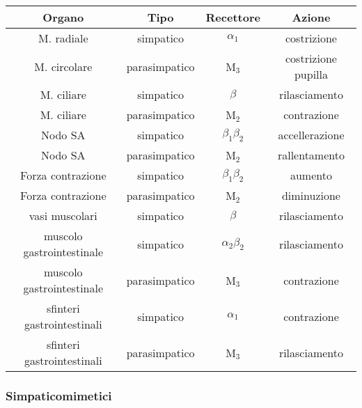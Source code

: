 \begin{tabular}{|c|c|c|c|}
\hline 
\textbf{Organo} & \textbf{Tipo} & \textbf{Recettore} & \textbf{Azione} \\ 
\hline\hline 
M. radiale & simpatico & $\alpha_1$ & costrizione \\ 
\hline 
M. circolare & parasimpatico & M${}_3$ & costrizione pupilla \\ 
\hline 
M. ciliare & simpatico & $\beta$ & rilasciamento \\ 
\hline 
M. ciliare & parasimpatico & M${}_2$ & contrazione \\ 
\hline 
Nodo SA & simpatico & $\beta_1\beta_2$ & accellerazione \\ 
\hline 
Nodo SA & parasimpatico & M${}_2$ & rallentamento \\ 
\hline 
Forza contrazione & simpatico & $\beta_1\beta_2$ & aumento \\ 
\hline 
Forza contrazione & parasimpatico & M${}_2$ & diminuzione \\ 
\hline 
vasi muscolari & simpatico & $\beta$ & rilasciamento \\ 
\hline 
muscolo gastrointestinale & simpatico & $\alpha_2\beta_2$ & rilasciamento \\ 
\hline 
muscolo gastrointestinale & parasimpatico & M${}_3$ & contrazione \\ 
\hline 
sfinteri gastrointestinali & simpatico & $\alpha_1$ & contrazione \\ 
\hline 
sfinteri gastrointestinali & parasimpatico & M${}_3$ & rilasciamento \\ 
\hline 
\end{tabular} 

\subsubsection{Simpaticomimetici}


